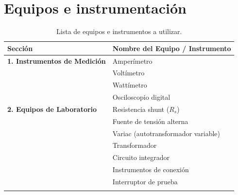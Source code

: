 \section{Equipos e instrumentación}

\begin{table}[htbp]
\centering
\caption{Lista de equipos e instrumentos a utilizar.}
\label{tab:equipos_estilo}
\begin{tabular}{ll}
\hline \hline \addlinespace[0.5ex]
\textbf{Sección} & \textbf{Nombre del Equipo / Instrumento} \\ [0.5ex] \hline \addlinespace[0.5ex]
\textbf{1. Instrumentos de Medición} & Amperímetro \\ 
 & Voltímetro \\ 
 & Wattímetro \\ 
 & Osciloscopio digital \\ \hline \addlinespace[0.5ex]
\textbf{2. Equipos de Laboratorio} & Resistencia shunt ($R_s$) \\ 
 & Fuente de tensión alterna \\ 
 & Variac (autotransformador variable) \\ 
 & Transformador \\ 
 & Circuito integrador \\ 
 & Instrumentos de conexión \\ 
 & Interruptor de prueba \\ \addlinespace[0.5ex] \hline
\end{tabular}
\end{table}
